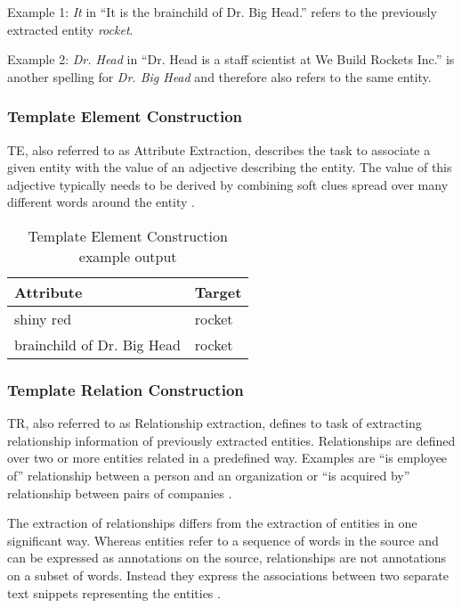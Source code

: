 Example 1: \textit{It} in \enquote{It is the brainchild of Dr. Big Head.} refers to the previously extracted entity \textit{rocket}.

Example 2: \textit{Dr. Head} in \enquote{Dr. Head is a staff scientist at We Build Rockets Inc.} is another spelling for \textit{Dr. Big Head} and therefore also refers to the same entity.

\subsubsection{Template Element Construction}
\gls{TE}, also referred to as Attribute Extraction, describes the task to associate a given entity with the value of an adjective describing the entity. The value of this adjective typically needs to be derived by combining soft clues spread over many different words around the entity
 \cite{Sarawagi:2008}.

\begin{table}[H]
\centering
\begin{tabular*}{\textwidth}{ l  l }
	\toprule
	\textbf{Attribute} & \textbf{Target} \\
	\midrule
	shiny red & rocket \\
	brainchild of Dr. Big Head & rocket \\
	\bottomrule
\end{tabular*}
\caption{Template Element Construction example output}
\end{table}

\subsubsection{Template Relation Construction}
\gls{TR}, also referred to as Relationship extraction, defines to task of extracting relationship information of previously extracted entities. Relationships are defined over two or more entities related in a predefined way. Examples are \enquote{is employee of} relationship between a person and an organization or \enquote{is acquired by} relationship between pairs of companies \cite{Sarawagi:2008}.

The extraction of relationships differs from the extraction of entities in one significant way. Whereas entities refer to a sequence of words in the source and can be expressed as annotations on the source, relationships are not annotations on a subset of words. Instead they express the associations between two separate text snippets representing the entities \cite{Sarawagi:2008}.

